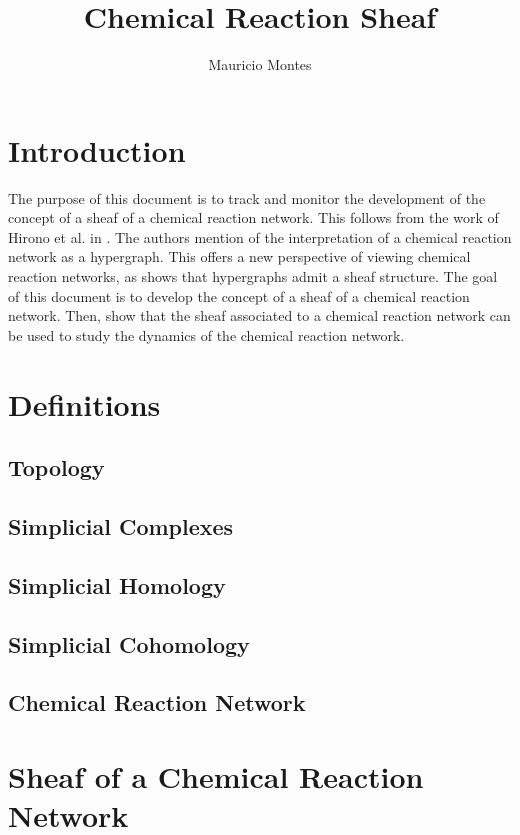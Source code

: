 \documentclass[12pt]{article}
\author{Mauricio Montes}
\title{Chemical Reaction Sheaf}
\theoremstyle{definition}
\newcommand{\<}{\langle}
\renewcommand{\>}{\rangle}
\begin{document}
\maketitle

\section{Introduction}

The purpose of this document is to track and monitor the development of the concept of
a sheaf of a chemical reaction network. This follows from the work of Hirono et al. in 
\cite{Hirono2021}. The authors mention of the interpretation of a chemical reaction network
as a hypergraph. This offers a new perspective of viewing chemical reaction networks, as 
\cite{duta2023sheaf} shows that hypergraphs admit a sheaf structure. The goal of this document
is to develop the concept of a sheaf of a chemical reaction network. Then, show that the 
sheaf associated to a chemical reaction network can be used to study the dynamics of the
chemical reaction network.

\section{Definitions}

\subsection{Topology}

\subsection{Simplicial Complexes}

\subsection{Simplicial Homology}

\subsection{Simplicial Cohomology}

\subsection{Chemical Reaction Network}


\section{Sheaf of a Chemical Reaction Network}
\end{document}
